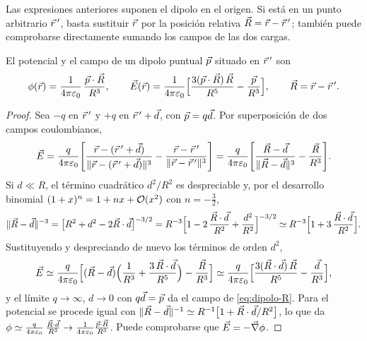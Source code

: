

Las expresiones anteriores suponen el dipolo en el origen. Si está en un punto arbitrario $\vec{r}\,'$, basta sustituir $\vec{r}$ por la posición
relativa $\vec{R}=\vec{r}-\vec{r}\,'$; también puede comprobarse directamente sumando los campos de las dos cargas.

\begin{proposicion}\label{prop:dipolo-Rp}
El potencial y el campo de un dipolo puntual $\vec{p}$ situado en $\vec{r}\,'$ son
\begin{equation}\label{eq:dipolo-R}
  \phi(\vec{r})=\frac{1}{4\pi\varepsilon_{0}}\,\frac{\vec{p}\cdot\vec{R}}{R^{3}},\qquad
  \vec{E}(\vec{r})=\frac{1}{4\pi\varepsilon_{0}}\Bigl[\frac{3(\vec{p}\cdot\vec{R})\,\vec{R}}{R^{5}}-\frac{\vec{p}}{R^{3}}\Bigr],\qquad \vec{R}=\vec{r}-\vec{r}\,' .
\end{equation}
\end{proposicion}
\begin{proof}
Sea $-q$ en $\vec{r}\,'$ y $+q$ en $\vec{r}\,'+\vec{d}$, con $\vec{p}=q\vec{d}$. Por superposición de dos campos coulombianos,
\[
  \vec{E}=\frac{q}{4\pi\varepsilon_{0}}\Biggl[\frac{\vec{r}-(\vec{r}\,'+\vec{d})}{\lVert \vec{r}-(\vec{r}\,'+\vec{d})\rVert^{3}}-\frac{\vec{r}-\vec{r}\,'}{\lVert \vec{r}-\vec{r}\,'\rVert^{3}}\Biggr]
  =\frac{q}{4\pi\varepsilon_{0}}\Biggl[\frac{\vec{R}-\vec{d}}{\lVert \vec{R}-\vec{d}\rVert^{3}}-\frac{\vec{R}}{R^{3}}\Biggr].
\]
Si $d\ll R$, el término cuadrático $d^{2}/R^{2}$ es despreciable y, por el desarrollo binomial $(1+x)^{n}=1+nx+\mathcal{O}(x^{2})$ con $n=-\frac32$,
\[
  \lVert \vec{R}-\vec{d}\rVert^{-3}=\bigl[R^{2}+d^{2}-2\vec{R}\cdot\vec{d}\bigr]^{-3/2}=R^{-3}\Bigl[1-2\,\frac{\vec{R}\cdot\vec{d}}{R^{2}}+\frac{d^{2}}{R^{2}}\Bigr]^{-3/2}
  \simeq R^{-3}\Bigl[1+3\,\frac{\vec{R}\cdot\vec{d}}{R^{2}}\Bigr].
\]
Sustituyendo y despreciando de nuevo los términos de orden $d^{2}$,
\[
  \vec{E}\simeq\frac{q}{4\pi\varepsilon_{0}}\Bigl[(\vec{R}-\vec{d})\Bigl(\frac{1}{R^{3}}+\frac{3\,\vec{R}\cdot\vec{d}}{R^{5}}\Bigr)-\frac{\vec{R}}{R^{3}}\Bigr]
  \simeq\frac{q}{4\pi\varepsilon_{0}}\Bigl[\frac{3(\vec{R}\cdot\vec{d})\,\vec{R}}{R^{5}}-\frac{\vec{d}}{R^{3}}\Bigr],
\]
y el límite $q\to\infty$, $d\to0$ con $q\vec{d}=\vec{p}$ da el campo de \cref{eq:dipolo-R}. Para el potencial se procede igual con
$\lVert \vec{R}-\vec{d}\rVert^{-1}\simeq R^{-1}\bigl[1+\vec{R}\cdot\vec{d}/R^{2}\bigr]$, lo que da
$\phi\simeq\frac{q}{4\pi\varepsilon_{0}}\,\frac{\vec{R}\cdot\vec{d}}{R^{3}}\to\frac{1}{4\pi\varepsilon_{0}}\frac{\vec{p}\cdot\vec{R}}{R^{3}}$. Puede comprobarse que $\vec{E}=-\vec{\nabla}\phi$.
\end{proof}

